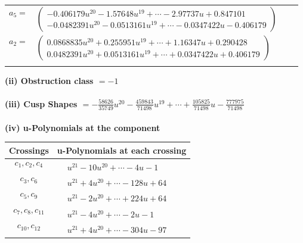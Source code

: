 \documentclass[1p]{elsarticle_modified}
\theoremstyle{definition}
\begin{document}
\begin{tabular}{m{7pt} m{180pt} m{7pt} m{180pt} }
\flushright $a_{5}=$&$\begin{pmatrix}-0.406179 u^{20}-1.57648 u^{19}+\cdots-2.97737 u+0.847101\\-0.0482391 u^{20}-0.0513161 u^{19}+\cdots-0.0347422 u-0.406179\end{pmatrix}$ \\
\flushright $a_{2}=$&$\begin{pmatrix}0.0868835 u^{20}+0.255951 u^{19}+\cdots+1.16347 u+0.290428\\0.0482391 u^{20}+0.0513161 u^{19}+\cdots+0.0347422 u+0.406179\end{pmatrix}$\\&\end{tabular}
\flushleft \textbf{(ii) Obstruction class $= -1$}\\~\\
\flushleft \textbf{(iii) Cusp Shapes $= -\frac{58626}{35749} u^{20}-\frac{459843}{71498} u^{19}+\cdots+\frac{105825}{71498} u-\frac{777975}{71498}$}\\~\\
\newpage\renewcommand{\arraystretch}{1}
\flushleft \textbf{(iv) u-Polynomials at the component}\newline \\
\begin{tabular}{m{50pt}|m{274pt}}
Crossings & \hspace{64pt}u-Polynomials at each crossing \\
\hline $$\begin{aligned}c_{1},c_{2},c_{4}\end{aligned}$$&$\begin{aligned}
&u^{21}-10 u^{20}+\cdots-4 u-1
\end{aligned}$\\
\hline $$\begin{aligned}c_{3},c_{6}\end{aligned}$$&$\begin{aligned}
&u^{21}+4 u^{20}+\cdots-128 u+64
\end{aligned}$\\
\hline $$\begin{aligned}c_{5},c_{9}\end{aligned}$$&$\begin{aligned}
&u^{21}-2 u^{20}+\cdots+224 u+64
\end{aligned}$\\
\hline $$\begin{aligned}c_{7},c_{8},c_{11}\end{aligned}$$&$\begin{aligned}
&u^{21}-4 u^{20}+\cdots-2 u-1
\end{aligned}$\\
\hline $$\begin{aligned}c_{10},c_{12}\end{aligned}$$&$\begin{aligned}
&u^{21}+4 u^{20}+\cdots-304 u-97
\end{aligned}$\\
\hline
\end{tabular}\\~\\
\end{document}
